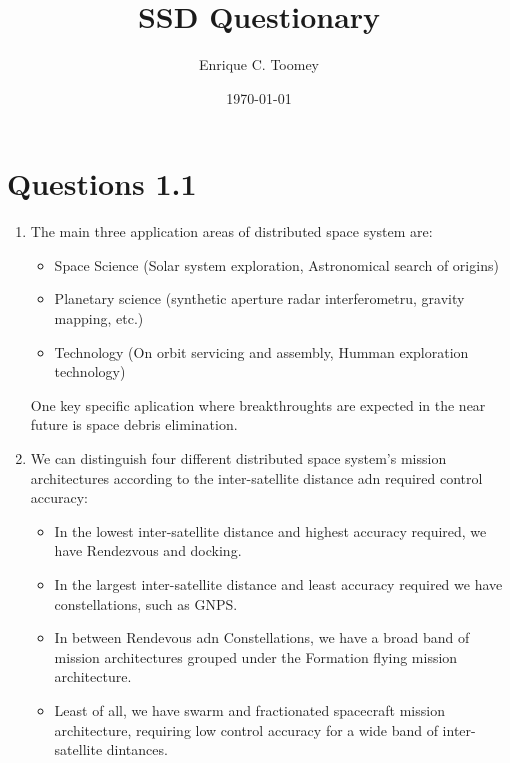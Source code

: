\documentclass[a4paper]{article}
\begin{document}
\title{SSD Questionary}
\author{Enrique C. Toomey}
\date{\today}
\maketitle


\section{Questions 1.1}
\begin{enumerate}[label=\emph{\alph*)},series=preguntas1_1]
  \item %
    The main three application areas of distributed space system are:
  \begin{itemize}
    \item Space Science (Solar system exploration, Astronomical search of origins)
    \item Planetary science (synthetic aperture radar interferometru, gravity mapping, etc.)
    \item Technology (On orbit servicing and assembly, Humman exploration technology)
  \end{itemize}
  One key specific aplication where breakthroughts are expected in the near future is space debris elimination.

  \item %
    We can distinguish four different distributed space system's  mission architectures according to the inter-satellite distance adn required control accuracy:
  \begin{itemize}
    \item In the lowest inter-satellite distance and highest accuracy required, we have Rendezvous and docking.
    \item In the largest inter-satellite distance and least accuracy required we have constellations, such as GNPS.
    \item In between Rendevous adn Constellations, we have a broad band of mission architectures grouped under the Formation flying mission architecture.
    \item Least of all, we have swarm and fractionated spacecraft mission architecture, requiring low control accuracy for a wide band of inter-satellite dintances.
  \end{itemize}


\end{enumerate}
\end{document}

